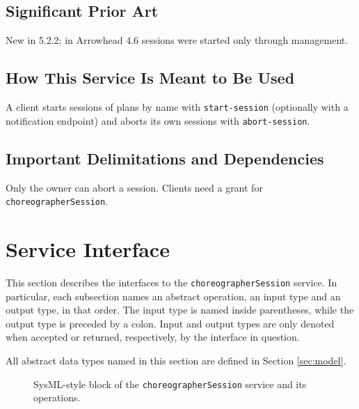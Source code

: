 \documentclass[a4paper]{arrowhead}
\begin{document}
\subsection{Significant Prior Art}

New in 5.2.2; in Arrowhead 4.6 sessions were started only through management.

\subsection{How This Service Is Meant to Be Used}

A client starts sessions of plans by name with \texttt{start-\allowbreak{}session} (optionally with a notification endpoint) and aborts its own sessions with \texttt{abort-\allowbreak{}session}.

\subsection{Important Delimitations and Dependencies}
\label{sec:delimitations}

Only the owner can abort a session. Clients need a grant for \texttt{choreographer\allowbreak{}Session}.

\newpage

\section{Service Interface}
\label{sec:operations}

This section describes the interfaces to the \texttt{choreographer\allowbreak{}Session} service.
In particular, each subsection names an abstract operation, an input type and an output type, in that order.
The input type is named inside parentheses, while the output type is preceded by a colon.
Input and output types are only denoted when accepted or returned, respectively, by the interface in question.

All abstract data types named in this section are defined in Section \ref{sec:model}.

\begin{figure}[ht!]
  \centering
  \caption{SysML-style block of the \texttt{choreographer\allowbreak{}Session} service and its operations.}
  \label{fig:SD}
\end{figure}
\end{document}
